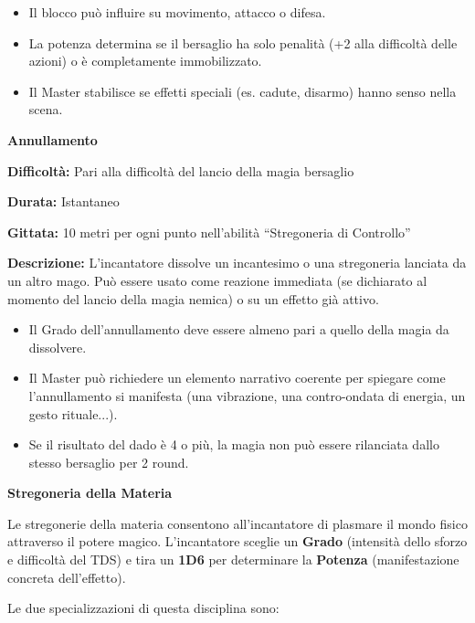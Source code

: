 \documentclass[./magie.tex]{subfiles}
\begin{document}
\begin{itemize}
\item Il blocco può influire su movimento, attacco o difesa.
\item La potenza determina se il bersaglio ha solo penalità (+2 alla difficoltà delle azioni) o è completamente immobilizzato.
\item Il Master stabilisce se effetti speciali (es. cadute, disarmo) hanno senso nella scena.
\end{itemize}

\clearpage
{\zarafirtitlefont\Large\bfseries\noindent Annullamento}\\
\begin{description}
\item \textbf{Difficoltà:} Pari alla difficoltà del lancio della magia bersaglio
\item \textbf{Durata:} Istantaneo
\item \textbf{Gittata:} 10 metri per ogni punto nell’abilità “Stregoneria di Controllo”
\item \textbf{Descrizione:} L’incantatore dissolve un incantesimo o una stregoneria lanciata da un altro mago. Può essere usato come reazione immediata (se dichiarato al momento del lancio della magia nemica) o su un effetto già attivo.
\end{description}

\begin{itemize}
\item Il Grado dell’annullamento deve essere almeno pari a quello della magia da dissolvere.
\item Il Master può richiedere un elemento narrativo coerente per spiegare come l’annullamento si manifesta (una vibrazione, una contro-ondata di energia, un gesto rituale...).
\item Se il risultato del dado è 4 o più, la magia non può essere rilanciata dallo stesso bersaglio per 2 round.
\end{itemize}

\clearpage
\vspace{0.2cm}
{\zarafirtitlefont\Large\bfseries Stregoneria della Materia}

Le stregonerie della materia consentono all’incantatore di plasmare il mondo fisico attraverso il potere magico. L’incantatore sceglie un \textbf{Grado} (intensità dello sforzo e difficoltà del TDS) e tira un \textbf{1D6} per determinare la \textbf{Potenza} (manifestazione concreta dell’effetto).

Le due specializzazioni di questa disciplina sono:
\end{document}
